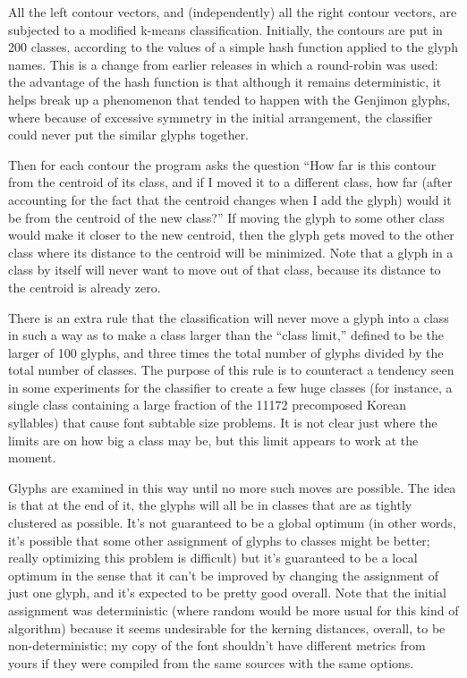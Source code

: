 \documentclass[14pt]{extarticle}
\begin{document}
All the left contour vectors, and (independently) all the right contour
vectors, are subjected to a modified k-means classification.  Initially, the
contours are put in 200 classes, according to the values of a simple hash
function applied to the glyph names.  This is a change from earlier releases
in which a round-robin was used: the advantage of the hash function is that
although it remains deterministic, it helps break up a phenomenon that
tended to happen with the Genjimon glyphs, where because of excessive
symmetry in the initial arrangement, the classifier could never put the
similar glyphs together.

Then for each contour the program asks the
question ``How far is this contour from the centroid of its class, and if I
moved it to a different class, how far (after accounting for the fact that
the centroid changes when I add the glyph) would it be from the centroid of
the new class?'' If moving the glyph to some other class would make it
closer to the new centroid, then the glyph gets moved to the other class
where its distance to the centroid will be minimized.  Note that a glyph in
a class by itself will never want to move out of that class, because its
distance to the centroid is already zero.

There is an extra rule that the classification will never move a glyph into
a class in such a way as to make a class larger than the ``class limit,''
defined to be the larger of 100 glyphs, and three times the total number of
glyphs divided by the total number of classes.  The purpose of this rule is
to counteract a tendency seen in some experiments for the classifier to
create a few huge classes (for instance, a single class containing a large
fraction of the 11172 precomposed Korean syllables) that cause font subtable
size problems.  It is not clear just where the limits are on how big a class
may be, but this limit appears to work at the moment.

Glyphs are examined in this way until no more such moves are possible.  The
idea is that at the end of it, the glyphs will all be in classes that are as
tightly clustered as possible.  It's not guaranteed to be a global optimum
(in other words, it's possible that some other assignment of glyphs to
classes might be better; really optimizing this problem is difficult) but
it's guaranteed to be a local optimum in the sense that it can't be improved
by changing the assignment of just one glyph, and it's expected to be pretty
good overall.  Note that the initial assignment was deterministic (where
random would be more usual for this kind of algorithm) because it seems
undesirable for the kerning distances, overall, to be non-deterministic; my
copy of the font shouldn't have different metrics from yours if they were
compiled from the same sources with the same options.
\end{document}

